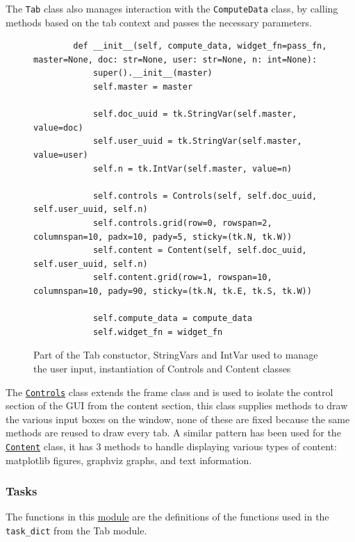 \documentclass[11pt]{article}
\newcommand{\code}[1]{\colorbox{light-gray}{\texttt{#1}}}
\begin{document}
The \code{Tab} class also manages interaction with the \code{ComputeData} class, by calling methods based on the tab context and passes the necessary parameters.

\begin{figure}[h]
    \begin{verbatim}
        def __init__(self, compute_data, widget_fn=pass_fn, master=None, doc: str=None, user: str=None, n: int=None):
            super().__init__(master)
            self.master = master

            self.doc_uuid = tk.StringVar(self.master, value=doc)
            self.user_uuid = tk.StringVar(self.master, value=user)
            self.n = tk.IntVar(self.master, value=n)

            self.controls = Controls(self, self.doc_uuid, self.user_uuid, self.n)
            self.controls.grid(row=0, rowspan=2, columnspan=10, padx=10, pady=5, sticky=(tk.N, tk.W))
            self.content = Content(self, self.doc_uuid, self.user_uuid, self.n)
            self.content.grid(row=1, rowspan=10, columnspan=10, pady=90, sticky=(tk.N, tk.E, tk.S, tk.W))

            self.compute_data = compute_data
            self.widget_fn = widget_fn
    \end{verbatim}
    \caption{Part of the Tab constuctor, StringVars and IntVar used to manage the user input, instantiation of Controls and Content classes}
    \label{fig:TabConstuctor}
\end{figure}

The \href{https://www2.macs.hw.ac.uk/~sf52/DocuTrace/html/DocuTrace.Gui.html#DocuTrace.Gui.Tab.Controls}{\code{Controls}} class extends the frame class and is used to isolate the control section of the GUI from the content section, this class supplies methods to draw the various input boxes on the window, none of these are fixed because the same methods are reused to draw every tab.
A similar pattern has been used for the \href{https://www2.macs.hw.ac.uk/~sf52/DocuTrace/html/DocuTrace.Gui.html#DocuTrace.Gui.Tab.Content}{\code{Content}} class, it has 3 methods to handle displaying various types of content: matplotlib figures, graphviz graphs, and text information.

\subsubsection{Tasks}
The functions in this \href{https://www2.macs.hw.ac.uk/~sf52/DocuTrace/html/DocuTrace.Gui.html#module-DocuTrace.Gui.Tasks}{module} are the definitions of the functions used in the \code{task\_dict} from the Tab module. 
\end{document}
